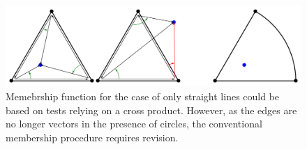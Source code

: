 \begin{figure} %
    \centering
    \includegraphics[width=1.\textwidth]{figures/intro_crossProdFail.png}
    \caption{Memebrship function for the case of only straight lines could be based on tests relying on a cross product.
    However, as the edges are no longer vectors in the presence of circles, the conventional membership procedure requires revision.}
    \label{fig:intro_crossProdFail}
\end{figure}
